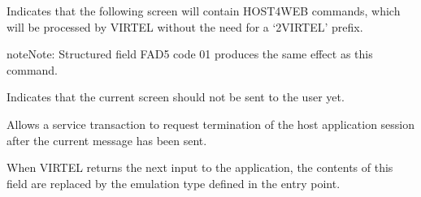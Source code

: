 \documentclass[letterpaper,10pt,english]{sphinxmanual}
\begin{document}

\begin{sphinxVerbatim}[commandchars=\\\{\}]
   
\end{sphinxVerbatim}

Indicates that the following screen will contain HOST4WEB commands, which will be processed by VIRTEL without the
need for a ‘2VIRTEL’ prefix.

\begin{sphinxadmonition}{note}{Note:}
Structured field FAD5 code 01 produces the same effect as this command.
\end{sphinxadmonition}


\begin{sphinxVerbatim}[commandchars=\\\{\}]
   
\end{sphinxVerbatim}

Indicates that the current screen should not be sent to the user yet.


\begin{sphinxVerbatim}[commandchars=\\\{\}]
 
\end{sphinxVerbatim}

Allows a service transaction to request termination of the host application session after the current message has been
sent.


\begin{sphinxVerbatim}[commandchars=\\\{\}]
  
\end{sphinxVerbatim}

When VIRTEL returns the next input to the application, the contents of this field are replaced by the emulation type
defined in the entry point.


\begin{sphinxVerbatim}[commandchars=\\\{\}]
  
\end{sphinxVerbatim}
\end{document}
